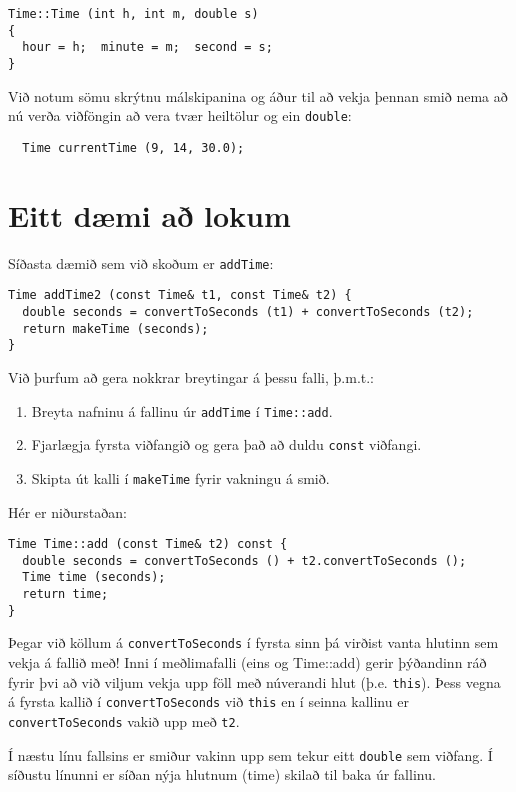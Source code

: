 \begin{verbatim}
Time::Time (int h, int m, double s)
{
  hour = h;  minute = m;  second = s;
}
\end{verbatim}
%
Við notum sömu skrýtnu málskipanina og áður til að vekja þennan smið nema að nú verða viðföngin að vera tvær heiltölur og ein {\tt double}:

\begin{verbatim}
  Time currentTime (9, 14, 30.0);
\end{verbatim}

\section {Eitt dæmi að lokum}

Síðasta dæmið sem við skoðum er {\tt addTime}:

\begin{verbatim}
Time addTime2 (const Time& t1, const Time& t2) {
  double seconds = convertToSeconds (t1) + convertToSeconds (t2);
  return makeTime (seconds);
}
\end{verbatim}
%
Við þurfum að gera nokkrar breytingar á þessu falli, þ.m.t.:

\begin{enumerate}

\item Breyta nafninu á fallinu úr {\tt addTime} í {\tt Time::add}.

\item Fjarlægja fyrsta viðfangið og gera það að duldu {\tt const} viðfangi.

\item Skipta út kalli í {\tt makeTime} fyrir vakningu á smið. 

\end{enumerate}
%
Hér er niðurstaðan:

\begin{verbatim}
Time Time::add (const Time& t2) const {
  double seconds = convertToSeconds () + t2.convertToSeconds ();
  Time time (seconds);
  return time;
}
\end{verbatim}
%
Þegar við köllum á {\tt convertToSeconds} í fyrsta sinn þá virðist vanta hlutinn sem vekja á fallið með!
Inni í meðlimafalli (eins og Time::add) gerir þýðandinn ráð fyrir þvi að við viljum vekja upp föll með núverandi hlut (þ.e. {\tt this}). 
Þess vegna á fyrsta kallið í {\tt convertToSeconds} við {\tt this} en í seinna kallinu er {\tt convertToSeconds} vakið upp með {\tt t2}.

Í næstu línu fallsins er smiður vakinn upp sem tekur eitt {\tt double} sem viðfang.
Í síðustu línunni er síðan nýja hlutnum (time) skilað til baka úr fallinu.

